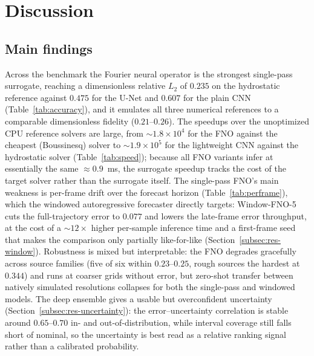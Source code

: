 \section{Discussion}
\label{sec:discussion}

\subsection{Main findings}
Across the benchmark the Fourier neural operator is the strongest single-pass surrogate, reaching a dimensionless relative $L_2$ of $0.235$ on the hydrostatic reference against $0.475$ for the U-Net and $0.607$ for the plain CNN (Table~\ref{tab:accuracy}), and it emulates all three numerical references to a comparable dimensionless fidelity ($0.21$--$0.26$). The speedups over the unoptimized CPU reference solvers are large, from $\sim$$1.8 \times 10 ^ {4}$ for the FNO against the cheapest (Boussinesq) solver to $\sim$$1.9 \times 10 ^ {5}$ for the lightweight CNN against the hydrostatic solver (Table~\ref{tab:speed}); because all FNO variants infer at essentially the same $\approx 0.9$~ms, the surrogate speedup tracks the cost of the target solver rather than the surrogate itself. The single-pass FNO's main weakness is per-frame drift over the forecast horizon (Table~\ref{tab:perframe}), which the windowed autoregressive forecaster directly targets: Window-FNO-5 cuts the full-trajectory error to $0.077$ and lowers the late-frame error throughput, at the cost of a $\sim$$12 \times$ higher per-sample inference time and a first-frame seed that makes the comparison only partially like-for-like (Section~\ref{subsec:res-window}). Robustness is mixed but interpretable: the FNO degrades gracefully across source families (five of six within $0.23$--$0.25$, rough sources the hardest at $0.344$) and runs at coarser grids without error, but zero-shot transfer between natively simulated resolutions collapses for both the single-pass and windowed models. The deep ensemble gives a usable but overconfident uncertainty (Section~\ref{subsec:res-uncertainty}): the error--uncertainty correlation is stable around $0.65$--$0.70$ in- and out-of-distribution, while interval coverage still falls short of nominal, so the uncertainty is best read as a relative ranking signal rather than a calibrated probability.


